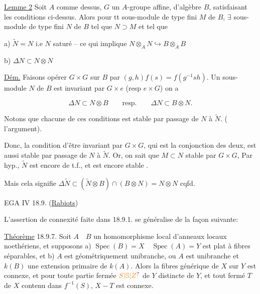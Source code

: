 \uline{Lemme 2} Soit  $A$ comme dessus, $G$ un $A$-groupe affine, d'algèbre $B$, satisfaisant les conditions ci-dessus. Alors pour tt sous-module de type fini $M$ de $B$, $\exists$ sous-module de type fini $N$ de $B$ tel que $N\supset M$ et tel que

a) $\widetilde N=N$ i.e $N$ saturé -- ce qui implique $N\otimes_A N\hookrightarrow B\otimes_A B$

b) $\Delta N\subset N\otimes N$

\uline{Dém.} Faisons opérer $G\times G$  sur $B$ par $(g,h)f(s)=f(g^{-1}sh)$.  Un sous-module $N$ de $B$ est invariant par $G\times e$ (resp $e\times G$\deleted{\unsure{)}})   on a

\[
\Delta N\subset N\otimes B\qquad\text{resp.}\qquad \Delta N\subset B\otimes N.
\]

Notons que  chacune de ces conditions est stable par passage de $N$ à $\widetilde N$. ( l'argument).

Donc, la condition d'être invariant par $G\times G$, qui est la conjonction des deux, est aussi stable par passage de $N$ à $\widetilde N$. Or, on sait que $M\subset N$  stable par $G\times G$, Par hyp., $\widetilde N$ est encore de t.f.,  et est encore stable .

Mais cela signifie $\Delta\widetilde N\subset(\widetilde N\otimes B)\cap(B\otimes N)=N\otimes N$ cqfd.

EGA IV 18.9. \qquad (\uline{Rabiots})

L'assertion de connexité faite dans 18.9.1. se généralise de la façon suivante:

\uline{Théorème} 18.9.7. Soit $A\quad B$ un homomorphisme local d'anneaux locaux noethériens, et supposons a)  $\operatorname{Spec}(B)=X\quad\operatorname{Spec}(A)=Y$ est plat à fibres séparables, et b) $A$ est géométriquement unibranche, ou $A$ est unibranche et $k(B)$ une extension primaire de $k(A)$. Alors la fibres générique de $X$ sur $Y$ est connexe, et pour toute partie fermée $\unsure{S|\mathbb S|Z}$ de $Y$ distincte de $Y$,  et tout fermé $T$ de $X$ contenu dans $f^{-1}(S)$, $X-T$ est connexe.

